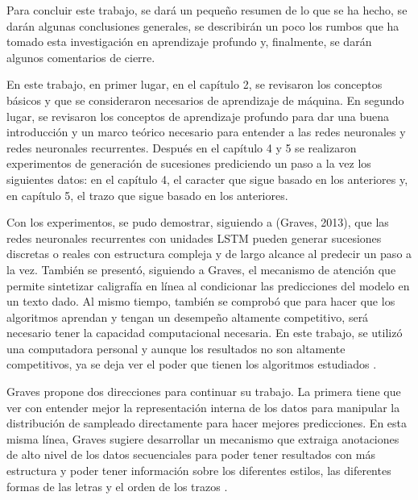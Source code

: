 Para concluir este trabajo, se dará un pequeño resumen de lo que se ha hecho, se darán algunas conclusiones generales, se describirán un poco los rumbos que ha tomado esta investigación en aprendizaje profundo y, finalmente, se darán algunos comentarios de cierre.

\vspace{1em}

En este trabajo, en primer lugar, en el capítulo 2, se revisaron los conceptos básicos y que se consideraron necesarios de aprendizaje de máquina. En segundo lugar, se revisaron los conceptos de aprendizaje profundo para dar una buena introducción y un marco teórico necesario para entender a las redes neuronales y redes neuronales recurrentes. Después en el capítulo 4 y 5 se realizaron experimentos de generación de sucesiones prediciendo un paso a la vez los siguientes datos: en el capítulo 4, el caracter que sigue basado en los anteriores y, en capítulo 5, el trazo que sigue basado en los anteriores.

\vspace{1em}

Con los experimentos, se pudo demostrar, siguiendo a (Graves, 2013), que las redes neuronales recurrentes con unidades LSTM pueden generar sucesiones discretas o reales con estructura compleja y de largo alcance al predecir un paso a la vez. También se presentó, siguiendo a Graves, el mecanismo de atención que permite sintetizar caligrafía en línea al condicionar las predicciones del modelo en un texto dado. Al mismo tiempo, también se comprobó que para hacer que los algoritmos aprendan y tengan un desempeño altamente competitivo, será necesario tener la capacidad computacional necesaria. En este trabajo, se utilizó una computadora personal y aunque los resultados no son altamente competitivos, ya se deja ver el poder que tienen los algoritmos estudiados \cite{DBLP:journals/corr/Graves13}.

\vspace{1em}

Graves propone dos direcciones para continuar su trabajo. La primera tiene que ver con entender mejor la representación interna de los datos para manipular la distribución de sampleado directamente para hacer mejores predicciones. En esta misma línea, Graves sugiere desarrollar un mecanismo que extraiga anotaciones de alto nivel de los datos secuenciales para poder tener resultados con más estructura y poder tener información sobre los diferentes estilos, las diferentes formas de las letras y el orden de los trazos \cite{DBLP:journals/corr/Graves13}.

